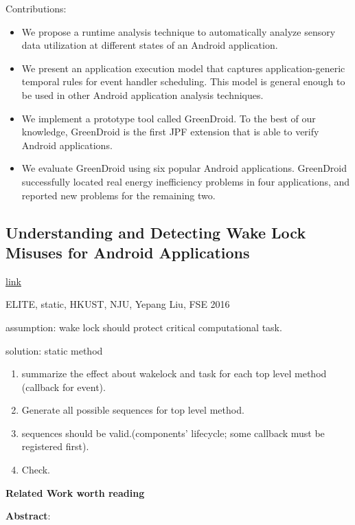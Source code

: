 Contributions:
\begin{itemize}
\item We propose a runtime analysis technique to automatically analyze sensory
  data utilization at different states of an Android application.
\item We present an application execution model that captures
  application-generic temporal rules for event handler scheduling. This model is
  general enough to be used in other Android application analysis techniques.
\item We implement a prototype tool called GreenDroid. To the best of our
  knowledge, GreenDroid is the first JPF extension that is able to verify
  Android applications.
\item We evaluate GreenDroid using six popular Android applications. GreenDroid
  successfully located real energy inefficiency problems in four applications,
  and reported new problems for the remaining two.
\end{itemize}


\subsection{Understanding and Detecting Wake Lock Misuses for Android Applications}

\href{http://dl.acm.org/citation.cfm?id=2950297}{link}

ELITE, static, HKUST, NJU, Yepang Liu, FSE 2016

assumption: wake lock should protect critical computational task.

solution: static method
\begin{enumerate}
\item summarize the effect about wakelock and task for each top level method
  (callback for event).
\item Generate all possible sequences for top level method.
\item sequences should be valid.(components' lifecycle; some callback must be
  registered first).
\item Check.
\end{enumerate}


\textbf{Related Work worth reading}


\textbf{Abstract}:

